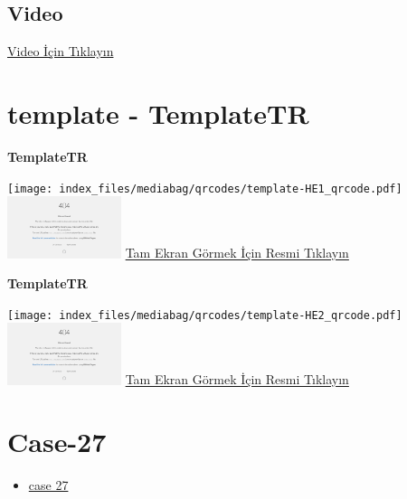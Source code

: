 \documentclass[
  letterpaper,
  DIV=11,
  numbers=noendperiod]{scrreprt}
\providecommand{\tightlist}{%
  \setlength{\itemsep}{0pt}\setlength{\parskip}{0pt}}\usepackage{longtable,booktabs,array}
\begin{document}
\hypertarget{video-25}{%
\subsection{Video}\label{video-25}}

\href{https://www.youtube.com/watch?v=UHadS40tpkY}{Video İçin Tıklayın}

\hypertarget{sec-template}{%
\section{template - TemplateTR}\label{sec-template}}

\textbf{TemplateTR}

\texttt{[image: index\_files/mediabag/qrcodes/template-HE1\_qrcode.pdf]}
\href{https://images.patolojiatlasi.com/template/HE1.html}{\includegraphics[width=0.25\textwidth,height=\textheight]{./screenshots/thumbnail_template-HE1.png}}
\href{https://images.patolojiatlasi.com/template/HE1.html}{Tam Ekran
Görmek İçin Resmi Tıklayın}

\textbf{TemplateTR}

\texttt{[image: index\_files/mediabag/qrcodes/template-HE2\_qrcode.pdf]}
\href{https://images.patolojiatlasi.com/template/HE2.html}{\includegraphics[width=0.25\textwidth,height=\textheight]{./screenshots/thumbnail_template-HE2.png}}
\href{https://images.patolojiatlasi.com/template/HE2.html}{Tam Ekran
Görmek İçin Resmi Tıklayın}

\hypertarget{sec-hacettepe-case-of-the-month-case-27}{%
\section{Case-27}\label{sec-hacettepe-case-of-the-month-case-27}}

\begin{itemize}
\tightlist
\item
  \href{https://www.youtube.com/watch?v=c2ePAdTH00g&ab_channel=KemalKosemehmetoglu}{case
  27}
\end{itemize}
\end{document}
